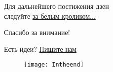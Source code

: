 \vspace*{\fill}
\begin{center}
    Для дальнейшего постижения дзен\\следуйте \href{https://antoniii.github.io/dzen}{за белым кроликом...}
\end{center}
\vspace{2em}
\begin{center}
    \large 
    Спасибо за внимание!

    \vspace{2em}
    Есть идеи?
    \href{mailto:anto-kha0@rambler.ru}{Пишите нам}
\end{center}
\vfill
\pagestyle{empty}

\begin{figure}[ht!]
    \centering
    \vspace*{-1.7cm}\hspace*{-3.2cm}
    \texttt{[image: Intheend]}
\end{figure}
